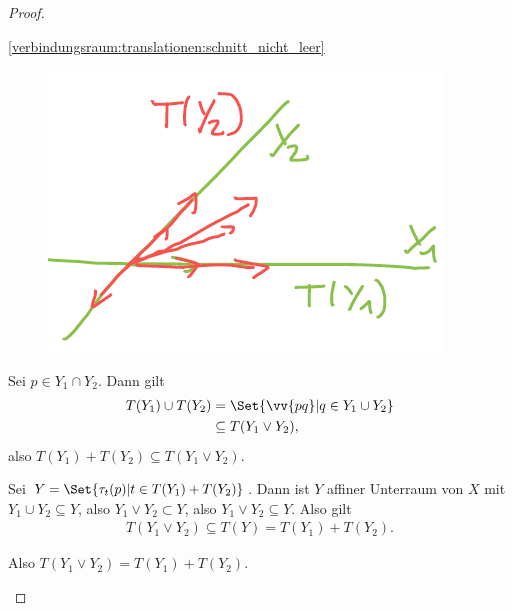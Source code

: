 \begin{proof}
    \begin{proofdescription}
        
        \item[\ref{verbindungsraum:translationen:schnitt_nicht_leer}]
        \begin{figure}[H]
            \centering
            \includegraphics[width=0.5\linewidth]{figures/verbindungsraum_translationen_schnitt_nicht_leer}
            \label{fig:verbindungsraum_translationen_schnitt_nicht_leer}
        \end{figure}
         Sei \( p\in Y_1\cap Y_2 \). Dann gilt
         \begin{align*}
             T(Y_1)\cup T(Y_2)\begin{aligned}[t] 
                &=\Set{\vv{pq}|q\in Y_1\cup Y_2}\\
                &\subseteq T(Y_1\vee Y_2),
             \end{aligned}
         \end{align*}
         also \( T(Y_1)+T(Y_2)\subseteq T(Y_1\vee Y_2) \).

         Sei \( Y=\Set{\tau_t(p)|t\in T(Y_1)+T(Y_2)} \).
         Dann ist \( Y \) affiner Unterraum von \( X \) mit \( Y_1\cup Y_2\subseteq Y \), also \( Y_1\vee Y_2\subset Y \), also \( Y_1\vee Y_2\subseteq Y \). Also gilt
         \begin{align*}
             T(Y_1\vee Y_2)\subseteq T(Y)=T(Y_1)+T(Y_2).
         \end{align*}
         
         Also \( T(Y_1\vee Y_2)=T(Y_1)+T(Y_2) \).
         

\end{proofdescription}
\end{proof}
